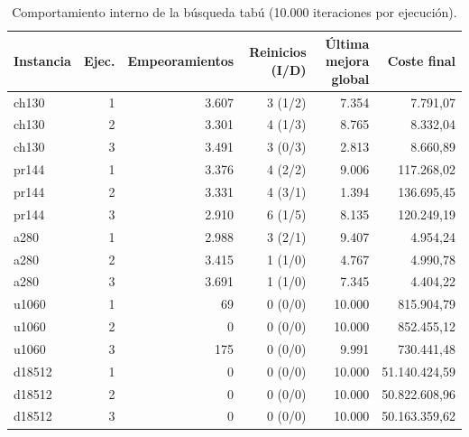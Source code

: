 \begin{table}[H]
\centering\footnotesize
\begin{tabular}{lrrrrr}
\toprule
Instancia & Ejec. & Empeoramientos & Reinicios (I/D) & Última mejora global & Coste final \\
\midrule
ch130 & 1 & 3{.}607 & 3 (1/2) & 7{.}354 & 7{.}791{,}07 \\
ch130 & 2 & 3{.}301 & 4 (1/3) & 8{.}765 & 8{.}332{,}04 \\
ch130 & 3 & 3{.}491 & 3 (0/3) & 2{.}813 & 8{.}660{,}89 \\
pr144 & 1 & 3{.}376 & 4 (2/2) & 9{.}006 & 117{.}268{,}02 \\
pr144 & 2 & 3{.}331 & 4 (3/1) & 1{.}394 & 136{.}695{,}45 \\
pr144 & 3 & 2{.}910 & 6 (1/5) & 8{.}135 & 120{.}249{,}19 \\
a280 & 1 & 2{.}988 & 3 (2/1) & 9{.}407 & 4{.}954{,}24 \\
a280 & 2 & 3{.}415 & 1 (1/0) & 4{.}767 & 4{.}990{,}78 \\
a280 & 3 & 3{.}691 & 1 (1/0) & 7{.}345 & 4{.}404{,}22 \\
u1060 & 1 & 69 & 0 (0/0) & 10{.}000 & 815{.}904{,}79 \\
u1060 & 2 & 0 & 0 (0/0) & 10{.}000 & 852{.}455{,}12 \\
u1060 & 3 & 175 & 0 (0/0) & 9{.}991 & 730{.}441{,}48 \\
d18512 & 1 & 0 & 0 (0/0) & 10{.}000 & 51{.}140{.}424{,}59 \\
d18512 & 2 & 0 & 0 (0/0) & 10{.}000 & 50{.}822{.}608{,}96 \\
d18512 & 3 & 0 & 0 (0/0) & 10{.}000 & 50{.}163{.}359{,}62 \\
\bottomrule
\end{tabular}
\caption{Comportamiento interno de la búsqueda tabú (10.000 iteraciones por ejecución).}
\label{tab:tabu}
\end{table}
